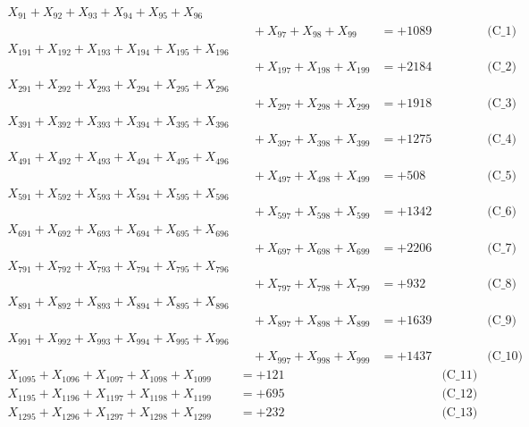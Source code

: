 \documentclass[a4paper,10pt]{article}
\begin{document}
\allowdisplaybreaks
{\small
\begin{align}
X_{91} + X_{92} + X_{93} + X_{94} + X_{95} + X_{96} \\[0.1ex]
&\quad  + X_{97} + X_{98} + X_{99} &= +1089 && \text{(C\_1)} \\
X_{191} + X_{192} + X_{193} + X_{194} + X_{195} + X_{196} \\[0.1ex]
&\quad  + X_{197} + X_{198} + X_{199} &= +2184 && \text{(C\_2)} \\
X_{291} + X_{292} + X_{293} + X_{294} + X_{295} + X_{296} \\[0.1ex]
&\quad  + X_{297} + X_{298} + X_{299} &= +1918 && \text{(C\_3)} \\
X_{391} + X_{392} + X_{393} + X_{394} + X_{395} + X_{396} \\[0.1ex]
&\quad  + X_{397} + X_{398} + X_{399} &= +1275 && \text{(C\_4)} \\
X_{491} + X_{492} + X_{493} + X_{494} + X_{495} + X_{496} \\[0.1ex]
&\quad  + X_{497} + X_{498} + X_{499} &= +508 && \text{(C\_5)} \\
\allowbreak
X_{591} + X_{592} + X_{593} + X_{594} + X_{595} + X_{596} \\[0.1ex]
&\quad  + X_{597} + X_{598} + X_{599} &= +1342 && \text{(C\_6)} \\
X_{691} + X_{692} + X_{693} + X_{694} + X_{695} + X_{696} \\[0.1ex]
&\quad  + X_{697} + X_{698} + X_{699} &= +2206 && \text{(C\_7)} \\
X_{791} + X_{792} + X_{793} + X_{794} + X_{795} + X_{796} \\[0.1ex]
&\quad  + X_{797} + X_{798} + X_{799} &= +932 && \text{(C\_8)} \\
X_{891} + X_{892} + X_{893} + X_{894} + X_{895} + X_{896} \\[0.1ex]
&\quad  + X_{897} + X_{898} + X_{899} &= +1639 && \text{(C\_9)} \\
X_{991} + X_{992} + X_{993} + X_{994} + X_{995} + X_{996} \\[0.1ex]
&\quad  + X_{997} + X_{998} + X_{999} &= +1437 && \text{(C\_10)} \\
\allowbreak
X_{1095} + X_{1096} + X_{1097} + X_{1098} + X_{1099} &= +121 && \text{(C\_11)} \\
X_{1195} + X_{1196} + X_{1197} + X_{1198} + X_{1199} &= +695 && \text{(C\_12)} \\
X_{1295} + X_{1296} + X_{1297} + X_{1298} + X_{1299} &= +232 && \text{(C\_13)} \\

\end{align}}
\end{document}
